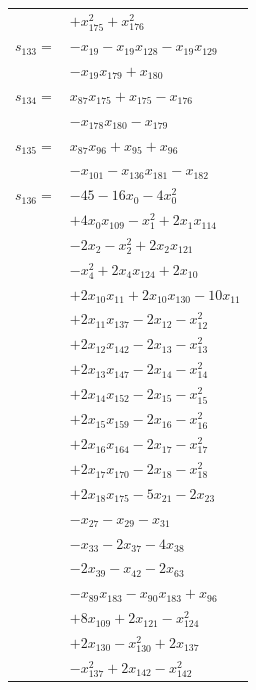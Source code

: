 \begin{longtable}{@{}r@{\;}l@{}}
 & \(\displaystyle +x_{175}^{2} +x_{176}^{2}\) \\[3pt]
\(s_{133}=\) & \(\displaystyle -x_{19} -x_{19}x_{128} -x_{19}x_{129}\) \\
 & \(\displaystyle -x_{19}x_{179} +x_{180}\) \\[3pt]
\(s_{134}=\) & \(\displaystyle x_{87}x_{175} +x_{175} -x_{176}\) \\
 & \(\displaystyle -x_{178}x_{180} -x_{179}\) \\[3pt]
\(s_{135}=\) & \(\displaystyle x_{87}x_{96} +x_{95} +x_{96}\) \\
 & \(\displaystyle -x_{101} -x_{136}x_{181} -x_{182}\) \\[3pt]
\(s_{136}=\) & \(\displaystyle -45 -16x_{0} -4x_{0}^{2}\) \\
 & \(\displaystyle +4x_{0}x_{109} -x_{1}^{2} +2x_{1}x_{114}\) \\
 & \(\displaystyle -2x_{2} -x_{2}^{2} +2x_{2}x_{121}\) \\
 & \(\displaystyle -x_{4}^{2} +2x_{4}x_{124} +2x_{10}\) \\
 & \(\displaystyle +2x_{10}x_{11} +2x_{10}x_{130} -10x_{11}\) \\
 & \(\displaystyle +2x_{11}x_{137} -2x_{12} -x_{12}^{2}\) \\
 & \(\displaystyle +2x_{12}x_{142} -2x_{13} -x_{13}^{2}\) \\
 & \(\displaystyle +2x_{13}x_{147} -2x_{14} -x_{14}^{2}\) \\
 & \(\displaystyle +2x_{14}x_{152} -2x_{15} -x_{15}^{2}\) \\
 & \(\displaystyle +2x_{15}x_{159} -2x_{16} -x_{16}^{2}\) \\
 & \(\displaystyle +2x_{16}x_{164} -2x_{17} -x_{17}^{2}\) \\
 & \(\displaystyle +2x_{17}x_{170} -2x_{18} -x_{18}^{2}\) \\
 & \(\displaystyle +2x_{18}x_{175} -5x_{21} -2x_{23}\) \\
 & \(\displaystyle -x_{27} -x_{29} -x_{31}\) \\
 & \(\displaystyle -x_{33} -2x_{37} -4x_{38}\) \\
 & \(\displaystyle -2x_{39} -x_{42} -2x_{63}\) \\
 & \(\displaystyle -x_{89}x_{183} -x_{90}x_{183} +x_{96}\) \\
 & \(\displaystyle +8x_{109} +2x_{121} -x_{124}^{2}\) \\
 & \(\displaystyle +2x_{130} -x_{130}^{2} +2x_{137}\) \\
 & \(\displaystyle -x_{137}^{2} +2x_{142} -x_{142}^{2}\) \\

\end{longtable}
